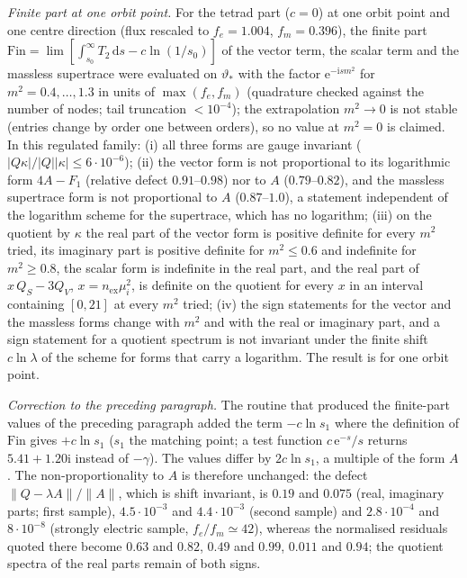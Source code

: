 \emph{Finite part at one orbit point.} For the tetrad part (\(c=0\)) at one orbit point and one centre direction (flux rescaled to \(f_e=1.004\), \(f_m=0.396\)), the finite part \(\mathrm{Fin}=\lim[\int_{s_0}^\infty T_2\,\mathrm ds-c\ln(1/s_0)]\) of the vector term, the scalar term and the massless supertrace were evaluated on \(\vartheta_*\) with the factor \(\mathrm e^{-\mathrm ism^2}\) for \(m^2=0.4,\dots,1.3\) in units of \(\max(f_e,f_m)\) (quadrature checked against the number of nodes; tail truncation \(<10^{-4}\)); the extrapolation \(m^2\to0\) is not stable (entries change by order one between orders), so no value at \(m^2=0\) is claimed. In this regulated family: (i) all three forms are gauge invariant (\(|Q\kappa|/|Q||\kappa|\le6\cdot10^{-6}\)); (ii) the vector form is not proportional to its logarithmic form \(4A-F_1\) (relative defect \(0.91\)--\(0.98\)) nor to \(A\) (\(0.79\)--\(0.82\)), and the massless supertrace form is not proportional to \(A\) (\(0.87\)--\(1.0\)), a statement independent of the logarithm scheme for the supertrace, which has no logarithm; (iii) on the quotient by \(\kappa\) the real part of the vector form is positive definite for every \(m^2\) tried, its imaginary part is positive definite for \(m^2\le0.6\) and indefinite for \(m^2\ge0.8\), the scalar form is indefinite in the real part, and the real part of \(x\,Q_S-3Q_V\), \(x=n_{\mathrm{ex}}\mu_i^2\), is definite on the quotient for every \(x\) in an interval containing \([0,21]\) at every \(m^2\) tried; (iv) the sign statements for the vector and the massless forms change with \(m^2\) and with the real or imaginary part, and a sign statement for a quotient spectrum is not invariant under the finite shift \(c\ln\lambda\) of the scheme for forms that carry a logarithm. The result is for one orbit point.

\emph{Correction to the preceding paragraph.} The routine that produced the finite-part values of the preceding paragraph added the term \(-c\ln s_1\) where the definition of \(\mathrm{Fin}\) gives \(+c\ln s_1\) (\(s_1\) the matching point; a test function \(c\,\mathrm e^{-s}/s\) returns \(5.41+1.20\mathrm i\) instead of \(-\gamma\)). The values differ by \(2c\ln s_1\), a multiple of the form \(A\). The non-proportionality to \(A\) is therefore unchanged: the defect \(\|Q-\lambda A\|/\|A\|\), which is shift invariant, is \(0.19\) and \(0.075\) (real, imaginary parts; first sample), \(4.5\cdot10^{-3}\) and \(4.4\cdot10^{-3}\) (second sample) and \(2.8\cdot10^{-4}\) and \(8\cdot10^{-8}\) (strongly electric sample, \(f_e/f_m\simeq42\)), whereas the normalised residuals quoted there become \(0.63\) and \(0.82\), \(0.49\) and \(0.99\), \(0.011\) and \(0.94\); the quotient spectra of the real parts remain of both signs.

